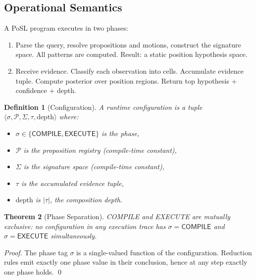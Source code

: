 \documentclass[twocolumn,10pt]{article}
\newtheorem{theorem}{Theorem}[section]
\newtheorem{definition}[theorem]{Definition}
\newcommand{\calP}{\mathcal{P}}     %
\begin{document}
\subsection{Operational Semantics}

A PoSL program executes in two phases:

\begin{enumerate}[leftmargin=1.5em,topsep=2pt,itemsep=1pt]
  \item[\textbf{COMPILE}] Parse the query, resolve propositions and motions,
    construct the signature space. All patterns are computed. Result:
    a static position hypothesis space.

  \item[\textbf{EXECUTE}] Receive evidence. Classify each observation into
    cells. Accumulate evidence tuple. Compute posterior over position
    regions. Return top hypothesis + confidence + depth.
\end{enumerate}

\begin{definition}[Configuration]
\label{def:config}
A runtime configuration is a tuple $\langle \sigma, \calP, \Sigma, \tau,
\text{depth} \rangle$ where:
\begin{itemize}[leftmargin=1.5em,topsep=2pt,itemsep=1pt]
  \item $\sigma \in \{\mathsf{COMPILE}, \mathsf{EXECUTE}\}$ is the phase,
  \item $\calP$ is the proposition registry (compile-time constant),
  \item $\Sigma$ is the signature space (compile-time constant),
  \item $\tau$ is the accumulated evidence tuple,
  \item $\text{depth}$ is $|\tau|$, the composition depth.
\end{itemize}
\end{definition}

\begin{theorem}[Phase Separation]
\label{thm:phase-sep}
COMPILE and EXECUTE are mutually exclusive: no configuration in any
execution trace has $\sigma = \mathsf{COMPILE}$ and $\sigma = \mathsf{EXECUTE}$
simultaneously.
\end{theorem}

\begin{proof}
The phase tag $\sigma$ is a single-valued function of the configuration.
Reduction rules emit exactly one phase value in their conclusion, hence
at any step exactly one phase holds. \qed
\end{proof}
\end{document}
